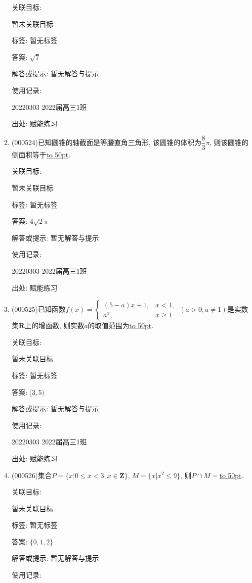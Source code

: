 \documentclass[10pt,a4paper]{article}
\newcommand{\blank}[1]{\underline{\hbox to #1pt{}}}
\begin{document}
\begin{enumerate}[1.]
关联目标:

暂未关联目标



标签: 暂无标签

答案: $\sqrt 7$

解答或提示: 暂无解答与提示

使用记录:

20220303	2022届高三1班	


出处: 赋能练习
\item { (000524)}已知圆锥的轴截面是等腰直角三角形, 该圆锥的体积为$\dfrac83\pi$, 则该圆锥的侧面积等于\blank{50}.


关联目标:

暂未关联目标



标签: 暂无标签

答案: $4\sqrt{2}\pi$

解答或提示: 暂无解答与提示

使用记录:

20220303	2022届高三1班	


出处: 赋能练习
\item { (000525)}已知函数$f(x)=\begin{cases} (5-a)x+1, & x<1, \\ a^x, & x\ge 1\end{cases} \ (a>0,a\ne 1)$是实数集$\mathbf{R}$上的增函数, 则实数$a$的取值范围为\blank{50}.


关联目标:

暂未关联目标



标签: 暂无标签

答案: $[3,5)$

解答或提示: 暂无解答与提示

使用记录:

20220303	2022届高三1班	


出处: 赋能练习
\item { (000526)}集合$P=\{x|0 \le x<3, x\in \mathbf{Z}\}$, $M=\{x|x^2 \le 9\}$, 则$P\cap M=$\blank{50}.


关联目标:

暂未关联目标



标签: 暂无标签

答案: $\{ 0,1,2 \}$

解答或提示: 暂无解答与提示

使用记录:


\end{enumerate}
\end{document}
